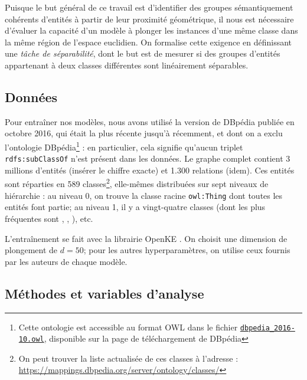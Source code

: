 Puisque le but général de ce travail est d'identifier des groupes sémantiquement cohérents d'entités à partir de leur proximité géométrique, il nous est nécessaire d'évaluer la capacité d'un modèle à plonger les instances d'une même classe dans la même région de l'espace euclidien. On formalise cette exigence en définissant une \textit{tâche de séparabilité}, dont le but est de mesurer si des groupes d'entités appartenant à deux classes différentes sont linéairement séparables.


\subsection{Données}
\label{subsec:kge-data-dbpedia}
Pour entraîner nos modèles, nous avons utilisé la version de DBpédia publiée en octobre 2016, qui était la plus récente jusqu'à récemment, et dont on a exclu l'ontologie DBpédia\footnote{Cette ontologie est accessible au format OWL dans le fichier \texttt{\href{http://downloads.dbpedia.org/2016-10/dbpedia\_2016-10.owl}{dbpedia\_2016-10.owl}}, disponible sur la page de téléchargement de DBpédia} : en particulier, cela signifie qu'aucun triplet \texttt{rdfs:subClassOf} n'est présent dans les données. Le graphe complet contient 3 millions d'entités (insérer le chiffre exacte) et 1.300 relations (idem). Ces entités sont réparties en 589 classes\footnote{On peut trouver la liste actualisée de ces classes à l'adresse : \href{mappings.dbpedia.org/server/ontology/classes/}{https://mappings.dbpedia.org/server/ontology/classes/}}, elle-mêmes distribuées sur sept niveaux de hiérarchie : au niveau 0, on trouve la classe racine \texttt{owl:Thing} dont toutes les entités font partie; au niveau 1, il y a vingt-quatre classes (dont les plus fréquentes sont , , ), etc. 

L'entraînement se fait avec la librairie OpenKE \cite{openke}. On choisit une dimension de plongement de $d=50$; pour les autres hyperparamètres, on utilise ceux fournis par les auteurs de chaque modèle.

\subsection{Méthodes et variables d'analyse}
\label{subsec:kge-sep-method}

